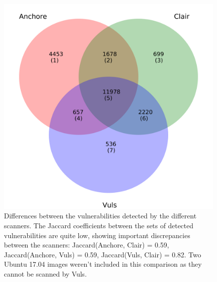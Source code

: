 \documentclass[a4paper,num-refs]{oup-contemporary}
\begin{document}
	\begin{figure}
        \includegraphics[width=\columnwidth]{Figures/venn.pdf}
	\caption{\label{fig:venn} Differences between the vulnerabilities detected
	by the different scanners. The Jaccard coefficients between the sets of
	detected vulnerabilities are quite low, showing important discrepancies
	between the scanners: Jaccard(Anchore, Clair) = 0.59, Jaccard(Anchore, Vuls) =
	0.59, Jaccard(Vuls, Clair) = 0.82. Two Ubuntu 17.04 images weren't
	included in this comparison as they cannot be scanned by Vuls.}
\end{figure}
\end{document}

